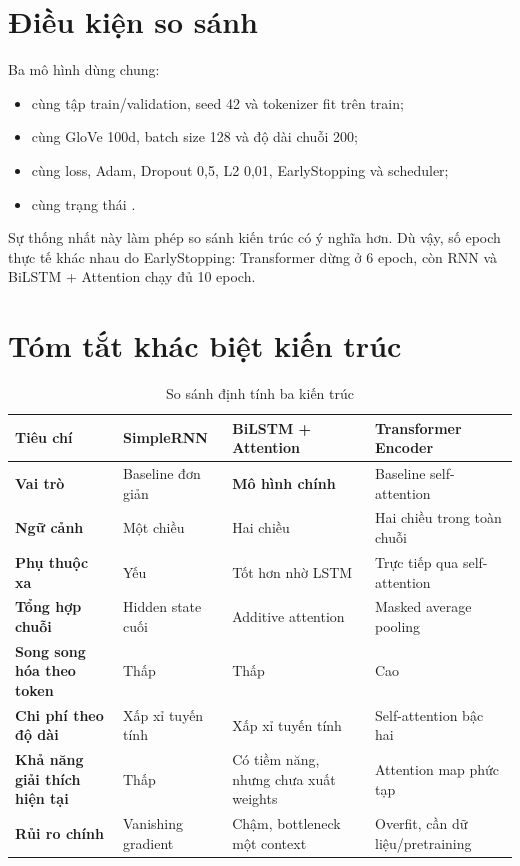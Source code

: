 \documentclass[12pt]{report}
\newcommand{\codeword}[1]{\texttt{\detokenize{#1}}}
\begin{document}
\section{Điều kiện so sánh}

Ba mô hình dùng chung:

\begin{itemize}
    \item cùng tập train/validation, seed 42 và tokenizer fit trên train;
    \item cùng GloVe 100d, batch size 128 và độ dài chuỗi 200;
    \item cùng loss, Adam, Dropout 0,5, L2 0,01, EarlyStopping và scheduler;
    \item cùng trạng thái \codeword{use_class_weights=true}.
\end{itemize}

Sự thống nhất này làm phép so sánh kiến trúc có ý nghĩa hơn. Dù vậy, số epoch
thực tế khác nhau do EarlyStopping: Transformer dừng ở 6 epoch, còn RNN và
BiLSTM + Attention chạy đủ 10 epoch.

\section{Tóm tắt khác biệt kiến trúc}

\begin{table}[H]
\centering
\caption{So sánh định tính ba kiến trúc}
\label{tab:architecture-comparison}
\begin{tabularx}{\linewidth}{>{\bfseries}l X X X}
\toprule
Tiêu chí & SimpleRNN & BiLSTM + Attention & Transformer Encoder \\
\midrule
Vai trò & Baseline đơn giản & \textbf{Mô hình chính} & Baseline self-attention \\
Ngữ cảnh & Một chiều & Hai chiều & Hai chiều trong toàn chuỗi \\
Phụ thuộc xa & Yếu & Tốt hơn nhờ LSTM & Trực tiếp qua self-attention \\
Tổng hợp chuỗi & Hidden state cuối & Additive attention & Masked average pooling \\
Song song hóa theo token & Thấp & Thấp & Cao \\
Chi phí theo độ dài & Xấp xỉ tuyến tính & Xấp xỉ tuyến tính & Self-attention bậc hai \\
Khả năng giải thích hiện tại & Thấp & Có tiềm năng, nhưng chưa xuất weights & Attention map phức tạp \\
Rủi ro chính & Vanishing gradient & Chậm, bottleneck một context & Overfit, cần dữ liệu/pretraining \\
\bottomrule
\end{tabularx}
\end{table}
\end{document}
